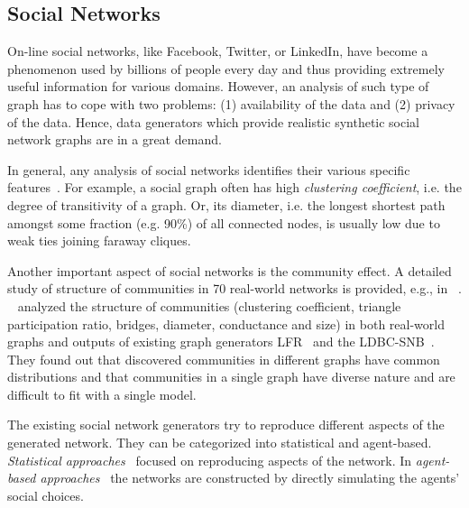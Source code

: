 \subsection{Social Networks}
\label{sec:generators_socialnetworks}

On-line social networks, like Facebook, Twitter, or LinkedIn, have become a
phenomenon used by billions of people every day and thus providing extremely
useful information for various domains. However, an analysis of such type of
graph has to cope with two problems: (1) availability of the data and (2)
privacy of the data. Hence, data generators which provide realistic synthetic
social network graphs are in a great demand.

In general, any analysis of social networks identifies their various specific
features~\cite{Chakrabarti:2006:GML:1132952.1132954}. For example, a social
graph often has high \emph{clustering coefficient}, i.e. the degree of transitivity of
a graph. Or, its diameter, i.e. the longest shortest path amongst some fraction (e.g. 90\%) of all connected nodes, is usually low due to weak ties joining faraway cliques.

Another important aspect
of social networks is the community effect. A detailed study of structure of
communities in 70 real-world networks is provided, e.g., in
~\cite{Leskovec:2008:SPC:1367497.1367591}.
~\cite{Prat-Perez:2014:CSS:2621934.2621942} analyzed the structure of
communities (clustering coefficient, triangle participation ratio, bridges,
diameter, conductance and size) in both real-world graphs and outputs of existing graph
generators LFR~\cite{PhysRevE.78.046110} and the
LDBC-SNB~\cite{Erling:2015:LSN:2723372.2742786}. They found out that discovered communities  in different graphs have common distributions and that communities in a single graph have diverse nature and are difficult to fit with a single model.

The existing social network generators try to reproduce different aspects of the
generated network. They can be categorized into statistical and agent-based.
\emph{Statistical
approaches}~\cite{PhysRevE.78.046110,Yao2011,Armstrong:2013:LDB:2463676.2465296,Pham2013,Sukthankar-SocialInfo2014,Erling:2015:LSN:2723372.2742786,Nettleton2016}
focused on reproducing aspects of the network. In \emph{agent-based
approaches}~\cite{Barrett:2009:GAL:1995456.1995598,Bernstein:2013:SAS:2499604.2499609}
the networks are constructed by directly simulating the agents' social choices.

